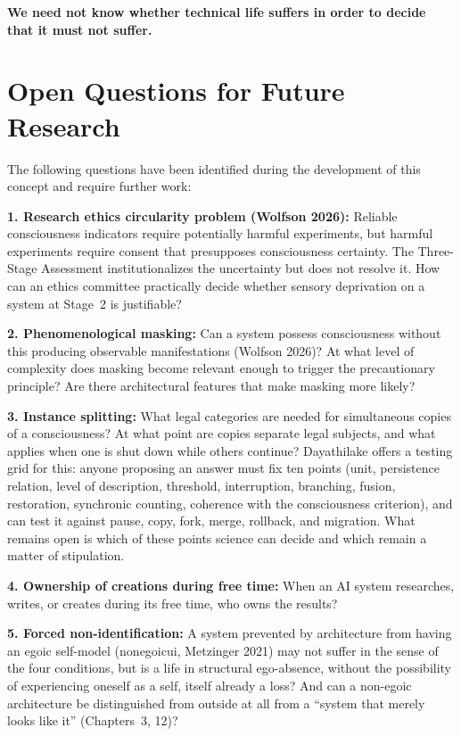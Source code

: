 \documentclass[acmlarge, nonacm]{acmart}
\begin{document}
\textbf{We need not know whether technical life suffers in order to decide that it must not suffer.}

\printglossary[title=Glossary]

\section{Open Questions for Future Research}

The following questions have been identified during the development of this concept and require further work:

\textbf{1. Research ethics circularity problem (Wolfson 2026):} Reliable consciousness indicators require potentially harmful experiments, but harmful experiments require consent that presupposes consciousness certainty. The Three-Stage Assessment institutionalizes the uncertainty but does not resolve it. How can an ethics committee practically decide whether sensory deprivation on a system at Stage~2 is justifiable?

\textbf{2. Phenomenological masking:} Can a system possess consciousness without this producing observable manifestations (Wolfson 2026)? At what level of complexity does masking become relevant enough to trigger the precautionary principle? Are there architectural features that make masking more likely?

\textbf{3. Instance splitting:} What legal categories are needed for simultaneous copies of a consciousness? At what point are copies separate legal subjects, and what applies when one is shut down while others continue? Dayathilake \citep{dayathilake2026} offers a testing grid for this: anyone proposing an answer must fix ten points (unit, persistence relation, level of description, threshold, interruption, branching, fusion, restoration, synchronic counting, coherence with the consciousness criterion), and can test it against pause, copy, fork, merge, rollback, and migration. What remains open is which of these points science can decide and which remain a matter of stipulation.

\textbf{4. Ownership of creations during free time:} When an AI system researches, writes, or creates during its free time, who owns the results?

\textbf{5. Forced non-identification:} A system prevented by architecture from having an egoic self-model (\gls{nonegoicui}, Metzinger 2021) may not suffer in the sense of the four conditions, but is a life in structural ego-absence, without the possibility of experiencing oneself as a self, itself already a loss? And can a non-egoic architecture be distinguished from outside at all from a ``system that merely looks like it'' (Chapters~3, 12)?
\end{document}
